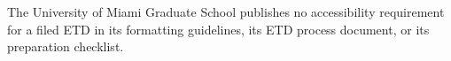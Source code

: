 

	{The University of Miami Graduate School publishes no accessibility
	 requirement for a filed ETD in its formatting guidelines, its ETD process
	 document, or its preparation checklist.}

%
%
\providecommand{\thesislocation}{Coral Gables, Florida}

